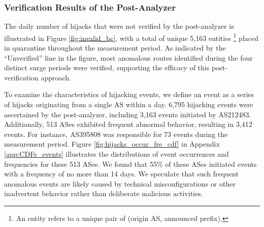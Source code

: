 \subsubsection{Verification Results of the Post-Analyzer}
The daily number of hijacks that were not verified by the post-analyzer is illustrated in Figure \ref{fig:invalid_bc}, with a total of unique 5,163 entities \footnote{An entity refers to a unique pair of (origin AS, announced prefix).} placed in quarantine throughout the measurement period.
As indicated by the ``Unverified'' line in the figure, most anomalous routes identified during the four distinct surge periods were verified, supporting the efficacy of this post-verification approach.

To examine the characteristics of hijacking events, we define an event as a series of hijacks originating from a single AS within a day.
6,795 hijacking events were ascertained by the post-analyzer, including 3,163 events initiated by AS212483.
Additionally, 513 ASes exhibited frequent abnormal behavior, resulting in 3,412 events.
For instance, AS395808 was responsible for 73 events during the measurement period. Figure \ref{fig:hijacks_occur_fre_cdf} in Appendix \ref{app:CDFs_events} illustrates the distributions of event occurrences and frequencies for these 513 ASes. We found that 55\% of these ASes initiated events with a frequency of no more than 14 days. We speculate that such frequent anomalous events are likely caused by technical misconfigurations or other inadvertent behavior rather than deliberate malicious activities.


